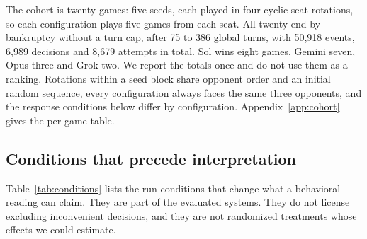The cohort is twenty games: five seeds, each played in four cyclic seat rotations, so each configuration plays five games from each seat. All twenty end by bankruptcy without a turn cap, after 75 to 386 global turns, with 50,918 events, 6,989 decisions and 8,679 attempts in total. Sol wins eight games, Gemini seven, Opus three and Grok two. We report the totals once and do not use them as a ranking. Rotations within a seed block share opponent order and an initial random sequence, every configuration always faces the same three opponents, and the response conditions below differ by configuration. Appendix~\ref{app:cohort} gives the per-game table.

\subsection{Conditions that precede interpretation}
\label{sec:conditions}

Table~\ref{tab:conditions} lists the run conditions that change what a behavioral reading can claim. They are part of the evaluated systems. They do not license excluding inconvenient decisions, and they are not randomized treatments whose effects we could estimate.

